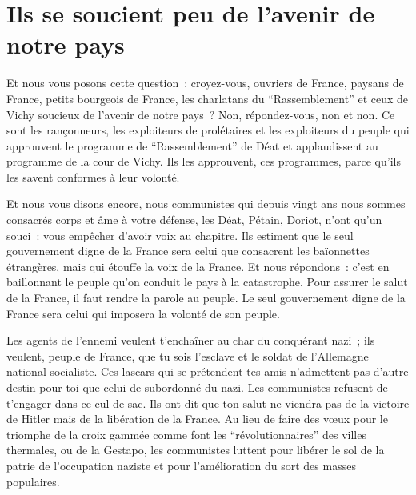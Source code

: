 \documentclass[french,twoside]{book} %
\begin{document}
\section[{Ils se soucient peu de l’avenir de notre pays}]{Ils se soucient peu de l’avenir de notre pays}
\noindent Et nous vous posons cette question : croyez-vous, ouvriers de France, paysans de France, petits bourgeois de France, les charlatans du “Rassemblement” et ceux de Vichy soucieux de l’avenir de notre pays ? Non, répondez-vous, non et non. Ce sont les rançonneurs, les exploiteurs de prolétaires et les exploiteurs du peuple qui approuvent le programme de “Rassemblement” de Déat et applaudissent au programme de la cour de Vichy. Ils les approuvent, ces programmes, parce qu’ils les savent conformes à leur volonté.\par
Et nous vous disons encore, nous communistes qui depuis vingt ans nous sommes consacrés corps et âme à votre défense, les Déat, Pétain, Doriot, n’ont qu’un souci : vous empêcher d’avoir voix au chapitre. Ils estiment que le seul gouvernement digne de la France sera celui que consacrent les baïonnettes étrangères, mais qui étouffe la voix de la France. Et nous répondons : c’est en baillonnant le peuple qu’on conduit le pays à la catastrophe. Pour assurer le salut de la France, il faut rendre la parole au peuple. Le seul gouvernement digne de la France sera celui qui imposera la volonté de son peuple.\par
Les agents de l’ennemi veulent t’enchaîner au char du conquérant nazi ; ils veulent, peuple de France, que tu sois l’esclave et le soldat de l’Allemagne national-socialiste. Ces lascars qui se prétendent tes amis n’admettent pas d’autre destin pour toi que celui de subordonné du nazi. Les communistes refusent de t’engager dans ce cul-de-sac. Ils ont dit que ton salut ne viendra pas de la victoire de Hitler mais de la libération de la France. Au lieu de faire des vœux pour le triomphe de la croix gammée comme font les “révolutionnaires” des villes thermales, ou de la Gestapo, les communistes luttent pour libérer le sol de la patrie de l’occupation naziste et pour l’amélioration du sort des masses populaires.
\end{document}
